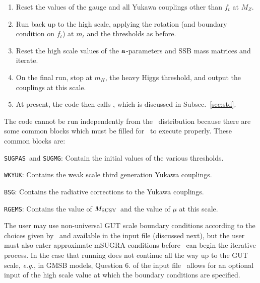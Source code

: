 \begin{enumerate}
\item Reset the values of the gauge and all Yukawa couplings other than $f_{t}$ at $M_Z$.
\item Run back up to the high scale, applying the rotation (and boundary condition on $f_{t}$) at $m_{t}$ and the thresholds as before.
\item Reset the high scale values of the ${\mathbf{a}}$-parameters and SSB mass matrices and iterate.
\item On the final run, stop at $m_{H}$, the heavy Higgs threshold, and output the couplings at this scale.
\item At present, the code then calls \progstd, which is discussed in Subsec.~\ref{sec:std}.
\end{enumerate} The code cannot be run independently from the
\progisa~distribution because there are some common blocks which must be
filled for
\progrge~to execute properly. These common blocks are:
\begin{itemise}
\item \texttt{SUGPAS}~and \texttt{SUGMG}: Contain the initial values of the various thresholds.
\item \texttt{WKYUK}: Contains the weak scale third generation Yukawa couplings.
\item \texttt{BSG}: Contains the radiative corrections to the Yukawa couplings.
\item \texttt{RGEMS}: Contains the value of $M_{\mathrm{SUSY}}$~and the value of $\mu$ at this scale.
\end{itemise}

The user may use non-universal GUT scale boundary conditions according
to the choices given by \progisasug~and available in the input file
(discussed next), but the user must also enter approximate mSUGRA
conditions before \progrge~can begin the iterative process. In the case
that running does not continue all the way up to the GUT scale,
\textit{e.g.}, in GMSB models, Question 6. of the input file
\inrge~allows for an optional input of the high scale value at which the
boundary conditions are specified.

